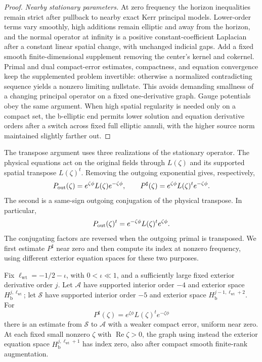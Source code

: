 \begin{proof}
\emph{Nearby stationary parameters.}
At zero frequency the horizon inequalities remain strict after
pullback to nearby exact Kerr principal models.  Lower-order terms
vary smoothly, high additions remain elliptic and away from the
horizon, and the normal operator at infinity is a positive
constant-coefficient Laplacian after a constant linear spatial
change, with unchanged indicial gaps.  Add a fixed smooth
finite-dimensional supplement removing the center's kernel and
cokernel.  Primal and dual compact-error estimates, compactness,
and equation convergence keep the supplemented problem invertible:
otherwise a normalized contradicting sequence yields a nonzero
limiting nullstate.  This avoids demanding smallness of a changing
principal operator on a fixed one-derivative graph.  Gauge
potentials obey the same argument.  When high spatial regularity is
needed only on a compact set, the b-elliptic end permits lower
solution and equation derivative orders after a switch across
fixed full elliptic annuli, with the higher source norm maintained
slightly farther out.
\end{proof}

The transpose argument uses three realizations of the stationary
operator.  The physical equations act on the original fields through
$L(\zeta)$ and its supported spatial transpose $L(\zeta)^t$.
Removing the outgoing exponential gives, respectively,
\[
 P_{\rm out}(\zeta)=e^{\zeta\phi}L(\zeta)e^{-\zeta\phi},
 \qquad
 P^\sharp(\zeta)=e^{\zeta\phi}L(\zeta)^t e^{-\zeta\phi}.
\]
The second is a same-sign outgoing conjugation of the physical
transpose.  In particular,
\[
 P_{\rm out}(\zeta)^t=e^{-\zeta\phi}L(\zeta)^t e^{\zeta\phi}.
\]
The conjugating factors are reversed when the outgoing primal is
transposed.  We first estimate $P^\sharp$ near zero and then compute
its index at nonzero frequency, using different exterior equation
spaces for these two purposes.

\begin{lemma}\label{st:transpose}
Fix $\ell_{\mathrm{wt}}=-1/2-\iota$, with $0<\iota\ll1$, and
a sufficiently large fixed exterior derivative order $j$.
Let $\mathcal A$ have supported interior order $-4$ and exterior
space $H_{\mathrm b}^{j,\ell_{\mathrm{wt}}}$; let $\mathcal S$
have supported interior order $-5$ and exterior space
$H_{\mathrm b}^{j-1,\ell_{\mathrm{wt}}+2}$.
For
\[
 P^\sharp(\zeta)=e^{\zeta\phi}L(\zeta)^t e^{-\zeta\phi}
\]
there is an estimate from $\mathcal S$ to $\mathcal A$ with a
weaker compact error, uniform near zero.
At each fixed small nonzero $\zeta$ with
$\operatorname{Re}\zeta>0$, the graph using instead the exterior
equation space $H_{\mathrm b}^{j,\ell_{\mathrm{wt}}+1}$
has index zero, also after compact smooth finite-rank augmentation.
\end{lemma}

